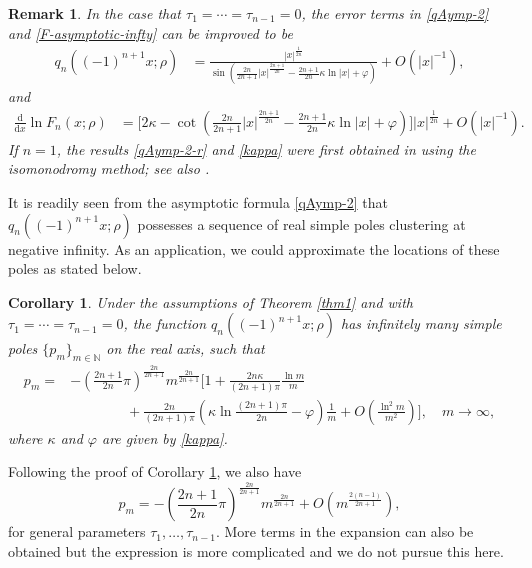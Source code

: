 \documentclass[11pt,a4paper]{article}
\newtheorem{corollary}[thm]{Corollary}
\newtheorem{rem}[thm]{Remark}
\numberwithin{equation}{section}
\begin{document}
\begin{rem}
In the case that $\tau_1=\cdots=\tau_{n-1}=0$, the error terms in \eqref{qAymp-2} and \eqref{F-asymptotic-infty} can be improved to be
\begin{align}\label{qAymp-2-r}
q_{n}\left((-1)^{n+1}x;\rho\right)&=\frac{|x|^{\frac{1}{2n}}}
{\sin\left(\frac{2n}{2n+1}|x|^{\frac{2n+1}{2n}}
-\frac{2n+1}{2n}\kappa\ln|x|+\varphi\right)}+O\left(|x|^{-1}\right),
\end{align}
and
\begin{align}\label{F-asymptotic-infty-r}
\frac{\mathrm{d}}{\mathrm{d}x}\ln F_n(x;\rho)&=\Bigg[2\kappa
-\cot\left(\frac{2n}{2n+1}|x|^{\frac{2n+1}{2n}}
-\frac{2n+1}{2n}\kappa\ln|x|+\varphi\right)
\Bigg]|x|^{\frac{1}{2n}}+O\left(|x|^{-1}\right).
\end{align}
If $n=1$, the results \eqref{qAymp-2-r} and \eqref{kappa} were first obtained in \cite{Kap} using the isomonodromy method; see also \cite{BI}.
\end{rem}


It is readily seen from the asymptotic formula \eqref{qAymp-2} that $q_{n}\left((-1)^{n+1}x;\rho\right)$ possesses a sequence of real simple poles clustering at negative infinity. As an application, we could approximate the locations of these poles as stated below.

\begin{corollary}\label{cor}
Under the assumptions of Theorem \ref{thm1} and
with
$\tau_1=\cdots=\tau_{n-1}=0$, the function  $q_{n}\left((-1)^{n+1}x;\rho\right)$ has infinitely many simple poles $\{p_m \}_{m\in \mathbb{N}}$ on the real axis, such that
\begin{align}\label{poles}
p_m=&-\left(\frac{2n+1}{2n}\pi\right)^{\frac{2n}{2n+1}}m^{\frac{2n}{2n+1}}
\bigg[1+\frac{2n\kappa}{(2n+1)\pi}\frac{\ln{m}}{m}
\nonumber\\
&\qquad\qquad+\frac{2n}{(2n+1)\pi}\left(\kappa\ln\frac{(2n+1)\pi}{2n}-\varphi\right)
\frac{1}{m}+O\left(\frac{\ln^2m}{m^2}\right)\bigg],\quad m\to\infty,
\end{align}
where $\kappa$ and $\varphi$ are given by \eqref{kappa}.
\end{corollary}
Following the proof of Corollary \ref{cor}, we also have
$$p_m= -\left(\frac{2n+1}{2n}\pi\right)^{\frac{2n}{2n+1}}m^{\frac{2n}{2n+1}}+O\left(m^{\frac{2(n-1)}{2n+1}}\right),$$
for general parameters $\tau_1,\dots,\tau_{n-1}$.  More terms in the expansion can also be obtained but the expression is more complicated
and we do not pursue this here.
\end{document}

